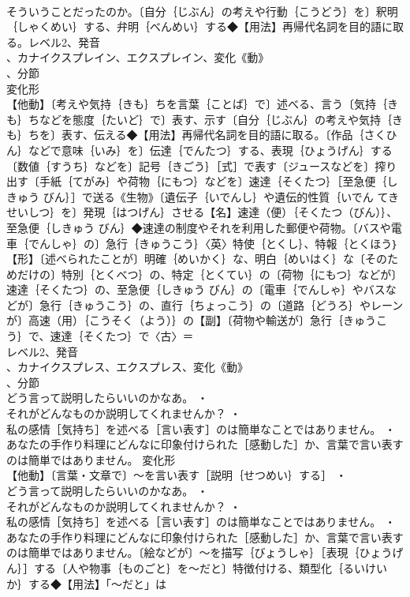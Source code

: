 \documentclass[8pt]{extreport}
\begin{document}
\begin{CJK}{UTF8}{min}
\\	そういうことだったのか。〔自分｛じぶん｝の考えや行動｛こうどう｝を〕釈明｛しゃくめい｝する、弁明｛べんめい｝する◆【用法】再帰代名詞を目的語に取る。レベル2、発音
\\	、カナイクスプレイン、エクスプレイン、変化《動》
\\	、分節
\\	変化形 
\\	【他動】〔考えや気持｛きも｝ちを言葉｛ことば｝で〕述べる、言う〔気持｛きも｝ちなどを態度｛たいど｝で〕表す、示す〔自分｛じぶん｝の考えや気持｛きも｝ちを〕表す、伝える◆【用法】再帰代名詞を目的語に取る。〔作品｛さくひん｝などで意味｛いみ｝を〕伝達｛でんたつ｝する、表現｛ひょうげん｝する〔数値｛すうち｝などを〕記号｛きごう｝［式］で表す〔ジュースなどを〕搾り出す〔手紙｛てがみ｝や荷物｛にもつ｝などを〕速達｛そくたつ｝［至急便｛しきゅう びん｝］で送る《生物》〔遺伝子｛いでんし｝や遺伝的性質｛いでん てき せいしつ｝を〕発現｛はつげん｝させる【名】速達（便）｛そくたつ（びん）｝、至急便｛しきゅう びん｝◆速達の制度やそれを利用した郵便や荷物。〔バスや電車｛でんしゃ｝の〕急行｛きゅうこう｝〈英〉特使｛とくし｝、特報｛とくほう｝【形】〔述べられたことが〕明確｛めいかく｝な、明白｛めいはく｝な〔そのためだけの〕特別｛とくべつ｝の、特定｛とくてい｝の〔荷物｛にもつ｝などが〕速達｛そくたつ｝の、至急便｛しきゅう びん｝の〔電車｛でんしゃ｝やバスなどが〕急行｛きゅうこう｝の、直行｛ちょっこう｝の〔道路｛どうろ｝やレーンが〕高速（用）｛こうそく（よう）｝の【副】〔荷物や輸送が〕急行｛きゅうこう｝で、速達｛そくたつ｝で〈古〉＝
\\	レベル2、発音
\\	、カナイクスプレス、エクスプレス、変化《動》
\\	、分節
\\	どう言って説明したらいいのかなあ。 ・
\\	それがどんなものか説明してくれませんか？ ・
\\	私の感情［気持ち］を述べる［言い表す］のは簡単なことではありません。 ・
\\	あなたの手作り料理にどんなに印象付けられた［感動した］か、言葉で言い表すのは簡単ではありません。	変化形 
\\	【他動】〔言葉・文章で〕～を言い表す［説明｛せつめい｝する］ ・
\\	どう言って説明したらいいのかなあ。 ・
\\	それがどんなものか説明してくれませんか？ ・
\\	私の感情［気持ち］を述べる［言い表す］のは簡単なことではありません。 ・
\\	あなたの手作り料理にどんなに印象付けられた［感動した］か、言葉で言い表すのは簡単ではありません。〔絵などが〕～を描写｛びょうしゃ｝［表現｛ひょうげん｝］する〔人や物事｛ものごと｝を～だと〕特徴付ける、類型化｛るいけい か｝する◆【用法】「～だと」は

\end{CJK}
\end{document}
